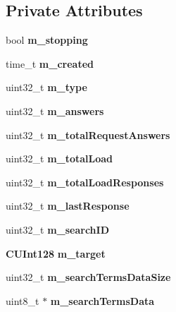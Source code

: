 \subsection*{Private Attributes}
\begin{DoxyCompactItemize}
\item 
bool {\bfseries m\_\-stopping}\label{classKademlia_1_1CSearch_ae0e0c9cff8ad41d41901f0b382d1cd1e}

\item 
time\_\-t {\bfseries m\_\-created}\label{classKademlia_1_1CSearch_aaa8a7f65d55ab0181fe28b8980b87cad}

\item 
uint32\_\-t {\bfseries m\_\-type}\label{classKademlia_1_1CSearch_a19c4cf40f412fdb44c25aaf3a6eb7a5d}

\item 
uint32\_\-t {\bfseries m\_\-answers}\label{classKademlia_1_1CSearch_afc48041ad3d77869f718b0349ba80d59}

\item 
uint32\_\-t {\bfseries m\_\-totalRequestAnswers}\label{classKademlia_1_1CSearch_ab7732bbfd43dfa5f1fb8307825d34cbc}

\item 
uint32\_\-t {\bfseries m\_\-totalLoad}\label{classKademlia_1_1CSearch_aa243884b484b3fa01480010ad019f977}

\item 
uint32\_\-t {\bfseries m\_\-totalLoadResponses}\label{classKademlia_1_1CSearch_ae27c6499a4d7800ffe2e4ee761852c9d}

\item 
uint32\_\-t {\bfseries m\_\-lastResponse}\label{classKademlia_1_1CSearch_a04118e7c1c16a8f83cb1dfcd68a4c80e}

\item 
uint32\_\-t {\bfseries m\_\-searchID}\label{classKademlia_1_1CSearch_a35c407f0f4b9fe8f50e85fa77847dbac}

\item 
{\bf CUInt128} {\bfseries m\_\-target}\label{classKademlia_1_1CSearch_ae95687953838cb79378da8c5dbf1b8b7}

\item 
uint32\_\-t {\bfseries m\_\-searchTermsDataSize}\label{classKademlia_1_1CSearch_a875747c9564800836773ed652874f609}

\item 
uint8\_\-t $\ast$ {\bfseries m\_\-searchTermsData}\label{classKademlia_1_1CSearch_ad6ff95a37c9c29ef1ee7d9a145e8ddfa}


\end{DoxyCompactItemize}

